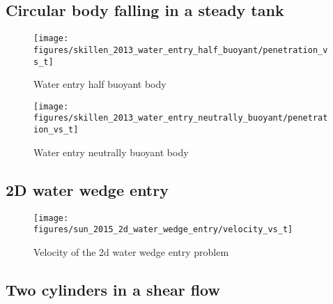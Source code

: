 \documentclass[preprint,12pt]{elsarticle}
\begin{document}



\FloatBarrier%
\subsection{Circular body falling in a steady tank}
\label{sec:res:circular-body-entry}


\begin{figure}[!htpb]
  \centering
  \texttt{[image: figures/skillen\_2013\_water\_entry\_half\_buoyant/penetration\_vs\_t]}
  \caption{Water entry half buoyant body}
\label{fig:xxxx}
\end{figure}

\begin{figure}[!htpb]
  \centering
  \texttt{[image: figures/skillen\_2013\_water\_entry\_neutrally\_buoyant/penetration\_vs\_t]}
  \caption{Water entry neutrally buoyant body}
\label{fig:xxxx}
\end{figure}

\citet{skillen_incompressible_2013}


\FloatBarrier%
\subsection{2D water wedge entry}
\label{sec:res:wedge_entry}

\citet{sun_numerical_2015}

\begin{figure}[!htpb]
  \centering
  \texttt{[image: figures/sun\_2015\_2d\_water\_wedge\_entry/velocity\_vs\_t]}
  \caption{Velocity of the 2d water wedge entry problem}
\label{fig:xxxx}
\end{figure}


\FloatBarrier%
\subsection{Two cylinders in a shear ﬂow}
\label{sec:res:hpf}
\end{document}
